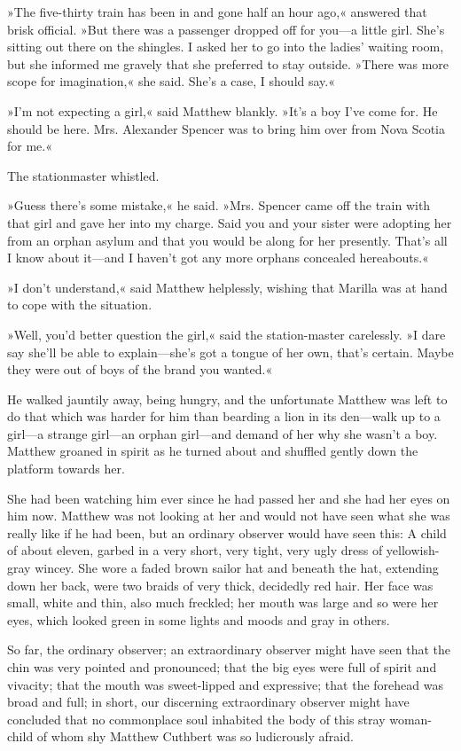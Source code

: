 »The five-thirty train has been in and gone half an hour ago,« answered that brisk official. »But there was a passenger dropped off for you—a little girl. She's sitting out there on the shingles. I asked her to go into the ladies' waiting room, but she informed me gravely that she preferred to stay outside. »There was more scope for imagination,« she said. She's a case, I should say.«

»I'm not expecting a girl,« said Matthew blankly. »It's a boy I've come for. He should be here. Mrs. Alexander Spencer was to bring him over from Nova Scotia for me.«

The stationmaster whistled.

»Guess there's some mistake,« he said. »Mrs. Spencer came off the train with that girl and gave her into my charge. Said you and your sister were adopting her from an orphan asylum and that you would be along for her presently. That's all I know about it—and I haven't got any more orphans concealed hereabouts.«

»I don't understand,« said Matthew helplessly, wishing that Marilla was at hand to cope with the situation.

»Well, you'd better question the girl,« said the station-master carelessly. »I dare say she'll be able to explain—she's got a tongue of her own, that's certain. Maybe they were out of boys of the brand you wanted.«

He walked jauntily away, being hungry, and the unfortunate Matthew was left to do that which was harder for him than bearding a lion in its den—walk up to a girl—a strange girl—an orphan girl—and demand of her why she wasn't a boy. Matthew groaned in spirit as he turned about and shuffled gently down the platform towards her.

She had been watching him ever since he had passed her and she had her eyes on him now. Matthew was not looking at her and would not have seen what she was really like if he had been, but an ordinary observer would have seen this: A child of about eleven, garbed in a very short, very tight, very ugly dress of yellowish-gray wincey. She wore a faded brown sailor hat and beneath the hat, extending down her back, were two braids of very thick, decidedly red hair. Her face was small, white and thin, also much freckled; her mouth was large and so were her eyes, which looked green in some lights and moods and gray in others.

So far, the ordinary observer; an extraordinary observer might have seen that the chin was very pointed and pronounced; that the big eyes were full of spirit and vivacity; that the mouth was sweet-lipped and expressive; that the forehead was broad and full; in short, our discerning extraordinary observer might have concluded that no commonplace soul inhabited the body of this stray woman-child of whom shy Matthew Cuthbert was so ludicrously afraid.

